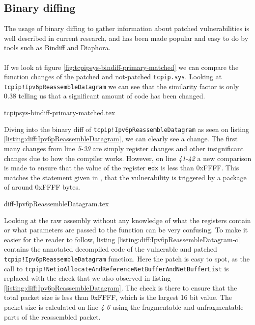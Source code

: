 \documentclass{report}
\begin{document}
\subsection{Binary diffing}
The usage of binary diffing to gather information about patched vulnerabilities is well described in current research\cite{url:binary-diffing:1}\cite{url:binary-diffing:2}, and has been made popular and easy to do by tools such as Bindiff\cite{url:bindiff:homepage} and Diaphora\cite{url:diaphora:homepage}. 
\\
\\
If we look at figure \ref{fig:tcpipsys-bindiff-primary-matched} we can compare the function changes of the patched and not-patched \texttt{tcpip.sys}. Looking at \texttt{tcpip!Ipv6pReassembleDatagram} we can see that the similarity factor is only 0.38 telling us that a significant amount of code has been changed.

{tcpipsys-bindiff-primary-matched.tex}

Diving into the binary diff of \texttt{tcpip!Ipv6pReassembleDatagram} as seen on listing \ref{listing:diff:Ipv6pReassembleDatagram}, we can clearly see a change. The first many changes from line \emph{5-39} are simply register changes and other insignificant changes due to how the compiler works. However, on line \emph{41-42} a new comparison is made to ensure that the value of the register \texttt{edx} is less than 0xFFFF. This matches the statement given in , that the vulnerability is triggered by a package of around 0xFFFF bytes.

{diff-Ipv6pReassembleDatagram.tex}

Looking at the raw assembly without any knowledge of what the registers contain or what parameters are passed to the function can be very confusing. To make it easier for the reader to follow, listing \ref{listing:diff:Ipv6pReassembleDatagram-c} contains the annotated decompiled code of the vulnerable and patched \texttt{tcpip!Ipv6pReassembleDatagram} function. Here the patch is easy to spot, as the call to \texttt{tcpip!NetioAllocateAndReferenceNetBufferAndNetBufferList} is replaced with the check that we also observed in listing \ref{listing:diff:Ipv6pReassembleDatagram}. The check is there to ensure that the total packet size is less than 0xFFFF, which is the largest 16 bit value. The packet size is calculated on line \emph{4-6} using the fragmentable and unfragmentable parts of the reassembled packet.
\end{document}
